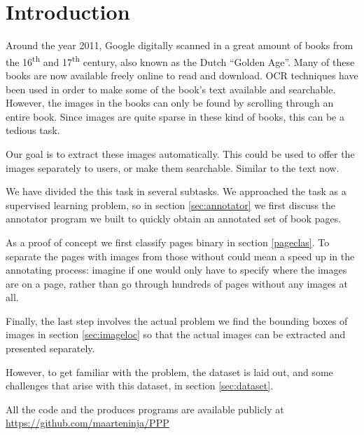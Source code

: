 \section{Introduction}
\label{sec:introduction}

%
Around the year 2011, Google digitally scanned in a great amount of books from
the 16\textsuperscript{th} and 17\textsuperscript{th} century, also known as the
Dutch ``Golden Age''. Many of these books are now available freely online to
read and download. OCR techniques have been used in order to make some of the book's
text available and searchable. However, the images in the books can only be
found by scrolling through an entire book. Since images are quite sparse in
these kind of books, this can be a tedious task.

Our goal is to extract these images automatically. This could be used to offer
the images separately to users, or make them searchable. Similar to the text
now.

We have divided the this task in several subtasks. We approached the task as a
supervised learning problem, so in section \ref{sec:annotator} we first discuss the
annotator program we built to quickly obtain an annotated set of book pages.

As a proof of concept we first classify pages binary in section \ref{pageclas}.
To separate the pages with images from those without could mean a speed up in the
annotating process: imagine if one
would only have to specify where the images are on a page, rather than go
through hundreds of pages without any images at all.

Finally, the last step involves the actual problem we find
the bounding boxes of images in section \ref{sec:imageloc} so that the actual
images can be extracted and presented separately.

However, to get familiar with the problem, the dataset is laid out, and some
challenges that arise with this dataset, in section \ref{sec:dataset}.

All the code and the produces programs are available publicly at
\url{https://github.com/maarteninja/PPP}

